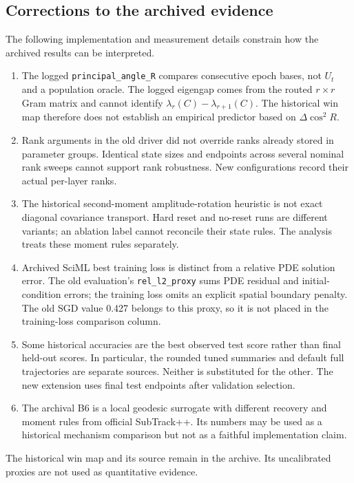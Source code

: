 \subsection{Corrections to the archived evidence}
The following implementation and measurement details constrain how the
archived results can be interpreted.
\begin{enumerate}[leftmargin=*]
\item The logged \texttt{principal\_angle\_R} compares consecutive epoch
bases, not $U_t$ and a population oracle. The logged eigengap comes from
the routed $r\times r$ Gram matrix and cannot identify
$\lambda_r(C)-\lambda_{r+1}(C)$. The historical win map therefore does
not establish an empirical predictor based on $\Delta\cos^2R$.
\item Rank arguments in the old driver did not override ranks already
stored in parameter groups. Identical state sizes and endpoints across
several nominal rank sweeps cannot support rank robustness. New configurations
record their actual per-layer ranks.
\item The historical second-moment amplitude-rotation heuristic is not
exact diagonal covariance transport. Hard reset and no-reset runs are
different variants; an ablation label cannot reconcile their state rules.
The analysis treats these moment rules separately.
\item Archived SciML best training loss is distinct from a relative PDE
solution error. The old evaluation's \texttt{rel\_l2\_proxy} sums PDE
residual and initial-condition errors; the training loss omits an explicit
spatial boundary penalty. The old SGD value 0.427 belongs to this proxy,
so it is not placed in the training-loss comparison column.
\item Some historical accuracies are the best observed test score rather
than final held-out scores. In particular, the rounded tuned summaries and
default full trajectories are separate sources. Neither is substituted
for the other. The new extension uses final test endpoints after validation
selection.
\item The archival B6 is a local geodesic surrogate with different recovery
and moment rules from official SubTrack++. Its numbers may be used as a
historical mechanism comparison but not as a faithful implementation claim.
\end{enumerate}

The historical win map and its source remain in the archive. Its
uncalibrated proxies are not used as quantitative evidence.

